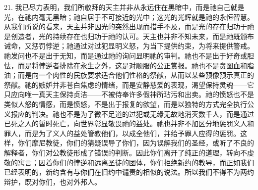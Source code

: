 21. 我已尽力表明，我们所敬拜的天主并非从永远住在黑暗中，而是祂自己就是光，在祂内毫无黑暗；祂自居于不可接近的光中；这光的光辉就是祂的永恒智慧。从我们所说的看来，天主并非因光的突然出现而措手不及，而是光的存在归功于祂是创造者，光的持续存在也归功于祂的认可。天主也并非不知未来，而是祂既颁布诫命，又惩罚悖逆；祂通过对过犯显明义怒，为当下提供约束，为将来提供警戒。祂发问也不是出于无知，而是通过祂的询问显明祂的审判。祂也不是出于好奇或胆怯，而是将悖逆者排除在永生之外，这是对顺服的公正赏报。祂也不是贪图血和脂油；而是向一个肉性的民族要求适合他们性格的祭献，从而以某些预像预示真正的祭献。祂的嫉妒并非苍白焦虑的情绪，而是安静慈爱的表现，渴望保持灵魂——它只应向唯一真天主保持贞洁——不被侍奉许多假神所玷污和出卖。祂的愤怒也不是类似人怒的情感，而是愤怒，不是出于报复的欲望，而是以独特的方式完全执行公义报应的判决。祂也不是为了微不足道的过犯或无缘无故地消灭数千人，而是通过已死之人的暂时死亡，向世界彰显敬畏祂的益处。祂也并非不加区分地惩罚义人和罪人，而是为了义人的益处管教他们，以成全他们，并给予罪人应得的惩罚。这样，你们摩尼教徒，你们的猜疑误导了你们，因为误解我们的圣经，或听了不良的解释者，你们对公教徒形成了错误的判断。因此你们离开了纯正的道理，转向不虔敬的寓言；因着你们的悖逆和远离圣徒的团体，你们拒绝新约的教导，而正如我们已经表明的，新约含有与你们在旧约中谴责的相似的说法。所以我们不得不为两约辩护，既对你们，也对外邦人。\par

